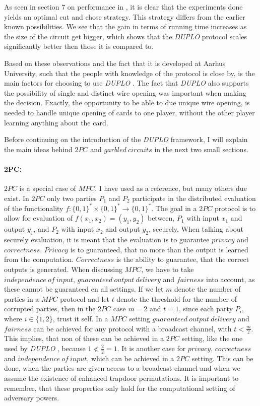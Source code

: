 \documentclass[twoside,11pt,openright]{report}
\newcommand{\DUPLO}{\textit{DUPLO} }
\begin{document}
As seen in section 7 on performance in \cite{duplo}, it is clear that the experiments done yields an optimal cut and chose strategy. This strategy differs from the earlier known possibilities. We see that the gain in terms of running time increases as the size of the circuit get bigger, which shows that the \DUPLO protocol scales significantly better then those it is compared to.

\bigskip

Based on these observations and the fact that it is developed at Aarhus University, such that the people with knowledge of the protocol is close by, is the main factors for choosing to use \DUPLO. The fact that \DUPLO also supports the possibility of single and distinct wire opening was important when making the decision. Exactly, the opportunity to be able to due unique wire opening, is needed to handle unique opening of cards to one player, without the other player learning anything about the card.

\bigskip

Before continuing on the introduction of the \DUPLO framework, I will explain the main ideas behind $2PC$ and $garbled~circuits$ in the next two small sections.

\bigskip

\paragraph{2PC:}
$2PC$ is a special case of $MPC$. I have used \cite{estpp} as a reference, but many others due exist. In $2PC$ only two parties $P_1$ and $P_2$ participate in the distributed evaluation of the functionality $f: \{0,1\}^* \times \{0,1\}^* \to \{0,1\}^*$. The goal in a $2PC$ protocol is to allow for evaluation of $f(x_1,x_2)=(y_1,y_2)$ between, $P_1$ with input $x_1$ and output $y_1$, and $P_2$ with input $x_2$ and output $y_2$, securely. When talking about securely evaluation, it is meant that the evaluation is to guarantee $privacy$ and $correctness$. $Privacy$ is to guaranteed, that no more than the output is learned from the computation. $Correctness$ is the ability to guarantee, that the correct outputs is generated. When discussing $MPC$, we have to take $independence~of~input$, $guaranteed~output~delivery$ and $fairness$ into account, as these cannot be guaranteed en all settings. If we let $m$ denote the number of parties in a $MPC$ protocol and let $t$ denote the threshold for the number of corrupted parties, then in the $2PC$ case $m=2$ and $t=1$, since each party $P_i$, where $i\in\{1,2\}$, trust it self. In a $MPC$ setting $guaranteed~output~delivery$ and $fairness$ can be achieved for any protocol with a broadcast channel, with $t<\frac{m}{2}$. This implies, that non of these can be achieved in a $2PC$ setting, like the one used by \DUPLO, because $1\not<\frac{2}{2}=1$. It is another case for $privacy$, $correctness$ and $independence~of~input$, which can be achieved in a $2PC$ setting. This can be done, when the parties are given access to a broadcast channel and when we assume the existence of enhanced trapdoor permutations. It is important to remember, that these properties only hold for the computational setting of adversary powers.
\end{document}
